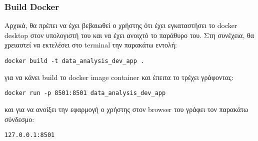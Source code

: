\documentclass[a4paper,12pt]{article}
\begin{document}
\subsubsection{Build Docker}
Αρχικά, θα πρέπει να έχει βεβαιωθεί ο χρήστης ότι έχει εγκαταστήσει το docker desktop στον υπολογιστή του και να έχει ανοιχτό το παράθυρο του. Στη συνέχεια, θα χρειαστεί να εκτελέσει στο terminal την παρακάτω εντολή:
\begin{lstlisting}
docker build -t data_analysis_dev_app .
\end{lstlisting}
για να κάνει build το docker image container και έπειτα το τρέχει γράφοντας:
\begin{lstlisting}
docker run -p 8501:8501 data_analysis_dev_app
\end{lstlisting}
και για να ανοίξει την εφαρμογή ο χρήστης στον browser του γράφει τον παρακάτω σύνδεσμο:
\begin{lstlisting}
127.0.0.1:8501
\end{lstlisting}

\newpage
\end{document}

